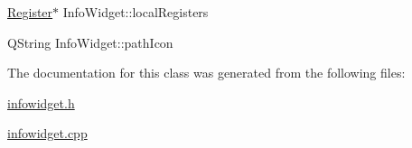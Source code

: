 \mbox{\label{classInfoWidget_a410514814006364f1abb4ce70e15ea90}} 
{\footnotesize\ttfamily \mbox{\hyperlink{classRegister}{Register}}$\ast$ Info\+Widget\+::\texorpdfstring{local\+Registers}{localRegisters}{\ttfamily [private]}}

\mbox{\label{classInfoWidget_ae0bf133d0a2f93b0536a47fcdad1fbe7}} 
{\footnotesize\ttfamily Q\+String Info\+Widget\+::\texorpdfstring{path\+Icon}{pathIcon}{\ttfamily [private]}}


The documentation for this class was generated from the following files\+:\begin{DoxyCompactItemize}
\item 
\mbox{\hyperlink{infowidget_8h}{infowidget.\+h}}\item 
\mbox{\hyperlink{infowidget_8cpp}{infowidget.\+cpp}}\end{DoxyCompactItemize}
\newpage